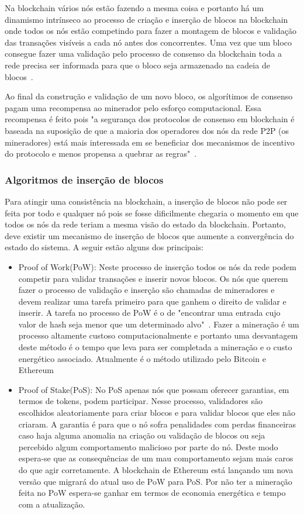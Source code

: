 \documentclass[12pt]{article}
\begin{document}
Na blockchain vários nós estão fazendo a mesma coisa e portanto há um dinamismo intrínseco ao processo de criação e inserção de blocos na blockchain onde todos os nós estão competindo para fazer a montagem de blocos e validação das transações visíveis a cada nó antes dos concorrentes. Uma vez que um bloco consegue fazer uma validação pelo processo de consenso da blockchain toda a rede precisa ser informada para que o bloco seja armazenado na cadeia de blocos~\cite{braga2017segurancca}.

Ao final da construção e validação de um novo bloco, os algorítimos de consenso pagam uma recompensa ao minerador pelo esforço computacional. Essa recompensa é feito pois "a segurança dos protocolos de consenso em blockchain é baseada na suposição de que a maioria dos operadores dos nós da rede P2P (os mineradores) está mais interessada em se beneficiar dos mecanismos de incentivo do protocolo e menos propensa a quebrar as regras"~\cite{braga2017segurancca}.

\subsubsection{Algoritmos de inserção de blocos}

Para atingir uma consistência na blockchain, a inserção de blocos não pode ser feita por todo e qualquer nó pois se fosse dificilmente chegaria o momento em que todos os nós da rede teriam a mesma visão do estado da blockchain. Portanto, deve existir um mecanismo de inserção de blocos que aumente a convergência do estado do sistema. A seguir estão alguns dos principais:
\begin{itemize}
    \item Proof of Work(PoW): Neste processo de inserção todos os nós da rede podem competir para validar transações e inserir novos blocos. Os nós que querem fazer o processo de validação e inserção são chamadas de mineradores e devem realizar uma tarefa primeiro para que ganhem o direito de validar e inserir. A tarefa no processo de PoW é o de "encontrar uma entrada cujo valor de hash seja menor que um determinado alvo"~\cite{miers2019analise}. Fazer a mineração é um processo altamente custoso computacionalmente e portanto uma desvantagem deste método é o tempo que leva para ser completada a mineração e o custo energético associado. Atualmente é o método utilizado pelo Bitcoin e Ethereum
    
    \item Proof of Stake(PoS): No PoS apenas nós que possam oferecer garantias, em termos de tokens, podem participar. Nesse processo, validadores são escolhidos aleatoriamente para criar blocos e para validar blocos que eles não criaram. A garantia é para que o nó sofra penalidades com perdas financeiras caso haja alguma anomalia na criação ou validação de blocos ou seja percebido algum comportamento malicioso por parte do nó. Deste modo espera-se que as consequências de um mau comportamento sejam mais caros do que agir corretamente. A blockchain de Ethereum está lançando um nova versão que migrará do atual uso de PoW para PoS. Por não ter a mineração feita no PoW espera-se ganhar em termos de economia energética e tempo com a atualização.   
\end{itemize}
\end{document}
